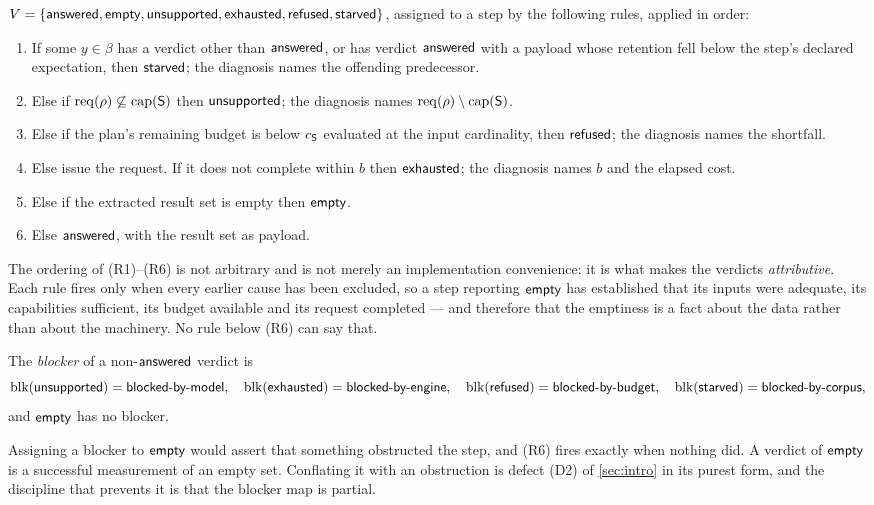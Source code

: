 \begin{definition}
\label{def:verdicts}
$V = \{\textsf{answered}, \textsf{empty}, \textsf{unsupported}, \textsf{exhausted}, \textsf{refused}, \textsf{starved}\}$, assigned to a step
by the following rules, applied in order:
\begin{enumerate}[label=(R\arabic*),leftmargin=3em]
\item If some $y \in \beta$ has a verdict other than $\textsf{answered}$, or has verdict
$\textsf{answered}$ with a payload whose retention fell below the step's declared
expectation, then $\textsf{starved}$; the diagnosis names the offending predecessor.
\item Else if $\mathrm{req}(\rho) \not\subseteq \mathrm{cap}(\mathsf{S})$ then $\textsf{unsupported}$; the
diagnosis names $\mathrm{req}(\rho)\setminus\mathrm{cap}(\mathsf{S})$.
\item Else if the plan's remaining budget is below $c_{\mathsf{S}}$ evaluated at
the input cardinality, then $\textsf{refused}$; the diagnosis names the shortfall.
\item Else issue the request. If it does not complete within $b$ then $\textsf{exhausted}$;
the diagnosis names $b$ and the elapsed cost.
\item Else if the extracted result set is empty then $\textsf{empty}$.
\item Else $\textsf{answered}$, with the result set as payload.
\end{enumerate}
\end{definition}

The ordering of (R1)--(R6) is not arbitrary and is not merely an implementation
convenience: it is what makes the verdicts \emph{attributive}. Each rule fires
only when every earlier cause has been excluded, so a step reporting $\textsf{empty}$
has established that its inputs were adequate, its capabilities sufficient, its
budget available and its request completed --- and therefore that the emptiness
is a fact about the data rather than about the machinery. No rule below (R6)
can say that.

\begin{definition}[Blocker]
\label{def:blocker}
The \emph{blocker} of a non-$\textsf{answered}$ verdict is
\[
\mathrm{blk}(\textsf{unsupported}) = \textsf{blocked-by-model},\quad
\mathrm{blk}(\textsf{exhausted}) = \textsf{blocked-by-engine},\quad
\mathrm{blk}(\textsf{refused}) = \textsf{blocked-by-budget},\quad
\mathrm{blk}(\textsf{starved}) = \textsf{blocked-by-corpus},
\]
and $\textsf{empty}$ has no blocker.
\end{definition}

\begin{remark}
Assigning a blocker to $\textsf{empty}$ would assert that something obstructed the
step, and (R6) fires exactly when nothing did. A verdict of $\textsf{empty}$ is a
successful measurement of an empty set. Conflating it with an obstruction is
defect (D2) of \cref{sec:intro} in its purest form, and the discipline that
prevents it is that the blocker map is partial.
\end{remark}

